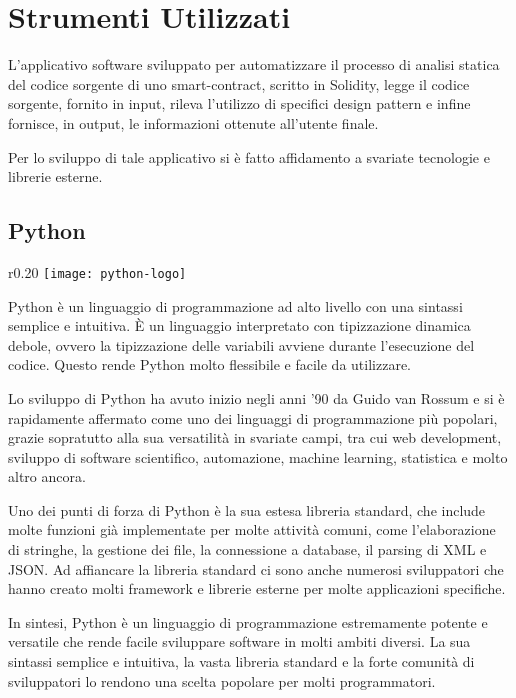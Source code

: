 \chapter{Strumenti Utilizzati}
L'applicativo software sviluppato per automatizzare il processo di analisi statica del codice sorgente di uno smart-contract, scritto in Solidity, legge il codice sorgente, fornito in input, rileva l'utilizzo di specifici design pattern e infine fornisce, in output, le informazioni ottenute all'utente finale.\par
Per lo sviluppo di tale applicativo si è fatto affidamento a svariate tecnologie e librerie esterne.

{\section{Python}

\begin{wrapfigure}{r}{0.20\textwidth}
	\centering
	\texttt{[image: python-logo]}
\end{wrapfigure}
Python\cite{python} è un linguaggio di programmazione ad alto livello con una sintassi semplice e intuitiva. È un linguaggio interpretato con tipizzazione dinamica debole, ovvero la tipizzazione delle variabili avviene durante l'esecuzione del codice. Questo rende Python molto flessibile e facile da utilizzare.\par
Lo sviluppo di Python ha avuto inizio negli anni '90 da Guido van Rossum e si è rapidamente affermato come uno dei linguaggi di programmazione più popolari, grazie sopratutto alla sua versatilità in svariate campi, tra cui web development, sviluppo di software scientifico, automazione, machine learning, statistica e molto altro ancora.\par
Uno dei punti di forza di Python è la sua estesa libreria standard, che include molte funzioni già implementate per molte attività comuni, come l'elaborazione di stringhe, la gestione dei file, la connessione a database, il parsing di XML e JSON. Ad affiancare la libreria standard ci sono anche numerosi sviluppatori che hanno creato molti framework e librerie esterne per molte applicazioni specifiche.\par
In sintesi, Python è un linguaggio di programmazione estremamente potente e versatile che rende facile sviluppare software in molti ambiti diversi. La sua sintassi semplice e intuitiva, la vasta libreria standard e la forte comunità di sviluppatori lo rendono una scelta popolare per molti programmatori.

}
